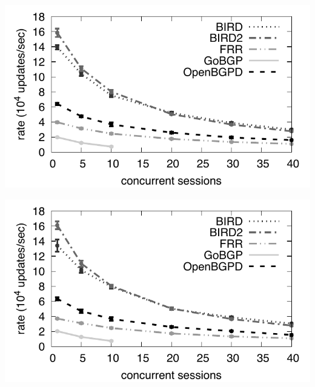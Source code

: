 \begin{minipage}[c]{.49\linewidth}
	\centering
	\includegraphics[width=\linewidth]{images/ssrt-scalability.pdf}
	\label{fig:ssrt-scalability}
\end{minipage}
\begin{minipage}[c]{.49\linewidth}
	\centering
	\includegraphics[width=\linewidth]{images/msrt-scalability.pdf}
	 \label{fig:msrt-scalability}
\end{minipage}
\vspace{1em}

